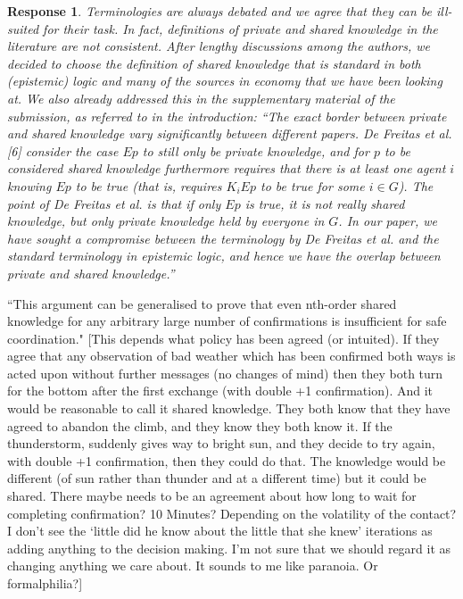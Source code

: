 \documentclass[a4paper]{article}
\newtheorem{response}{Response}
\begin{document}
\begin{response}
Terminologies are always debated and we agree that they can be ill-suited for their task. In fact, definitions of private and shared knowledge in the literature are not consistent. After lengthy discussions among the authors, we decided to choose the definition of shared knowledge that is standard in both (epistemic) logic and many of the sources in economy that we have been looking at. We also already addressed this in the supplementary material of the submission, as referred to in the introduction:  ``The exact border between private and shared knowledge vary significantly between different papers. De Freitas et al. [6] consider the case $Ep$ to still only be private knowledge, and for $p$ to be considered shared knowledge furthermore requires that there is at least one agent $i$ knowing $Ep$ to be true (that is, requires $K_i Ep$ to be true for some $i \in G$). The point of De Freitas et al. is that if only $Ep$ is true, it is not really shared knowledge, but only private knowledge held by everyone in $G$. In our paper, we have sought a compromise between the terminology by De Freitas et al. and the standard terminology in epistemic logic, and hence we have the overlap between private and shared knowledge.''
\end{response}

``This argument can be generalised to prove that even nth-order shared knowledge for any arbitrary large number of confirmations is insufficient for safe coordination." [This depends what policy has been agreed (or intuited). If they agree that any observation of bad weather which has been confirmed both ways is acted upon without further messages (no changes of mind) then they both turn for the bottom after the first exchange (with double +1 confirmation). And it would be reasonable to call it shared knowledge. They both know that they have agreed to abandon the climb, and they know they both know it. If the thunderstorm, suddenly gives way to bright sun, and they decide to try again, with double +1 confirmation, then they could do that. The knowledge would be different (of sun rather than thunder and at a different time) but it could be shared. There maybe needs to be an agreement about how long to wait for completing confirmation? 10 Minutes? Depending on the volatility of the contact? I don't see the `little did he know about the little that she knew' iterations as adding anything to the decision making. I'm not sure that we should regard it as changing anything we care about. It sounds to me like paranoia. Or formalphilia?]
\end{document}
